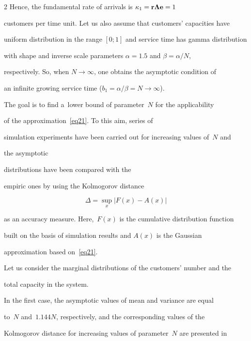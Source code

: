 \begin{multicols}{2}
Hence, the fundamental rate of arrivals is $\kappa_1\linebreak =\mathbf{r\Lambda e}=1$ 


customers per time unit. Let us also assume that customers' capacities have 


uniform distribution in the range $[0;1]$ and service time has gamma distribution 


with shape and inverse scale parameters $\alpha = 1.5$ and $\beta = \alpha/ N$, 


respectively. So, when $N \to\infty$, one obtains the asymptotic condition of 


an infinite growing service time ($b_1 = \alpha / \beta = N \to \infty$).





The goal is to find a~lower bound of parameter~$N$ for the applicability 


of the approximation~\eqref{eq21}. To this aim,  series of


 simulation experiments have been  carried out for increasing values of~$N$ and 


  the asymptotic


  distributions    have been compared with the


  empiric ones by using the Kolmogorov distance~\cite{lit3,lit6}


$$


\Delta=\sup\limits_x\left| F\left( x\right) -A\left( x\right) \right| 


$$


as an accuracy measure. Here,~$F(x)$ is the cumulative distribution function 


built on the basis of simulation results and $A(x)$ is the Gaussian 


approximation based on~\eqref{eq21}.





Let us consider the marginal distributions of the customers' number and the 


total capacity in the system.





In the first case, the asymptotic values of mean and variance are equal 


to~$N$ and~$1.144 N$, respectively, and the corresponding values of the 


Kolmogorov distance for increasing values of parameter~$N$ are presented in 



\end{multicols}
